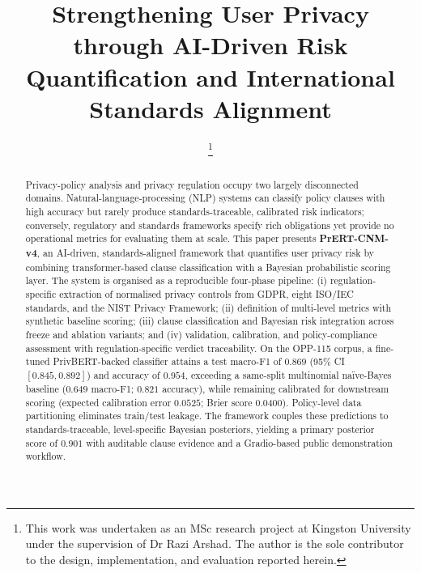 \documentclass[conference]{IEEEtran}
\begin{document}
\title{Strengthening User Privacy through AI-Driven Risk Quantification and International Standards Alignment}

\author{%
%
\thanks{This work was undertaken as an MSc research project at Kingston University under the supervision of Dr Razi Arshad. The author is the sole contributor to the design, implementation, and evaluation reported herein.}%
}

\maketitle

\begin{abstract}
Privacy-policy analysis and privacy regulation occupy two largely
disconnected domains. Natural-language-processing (NLP) systems can
classify policy clauses with high accuracy but rarely produce
standards-traceable, calibrated risk indicators; conversely, regulatory
and standards frameworks specify rich obligations yet provide no
operational metrics for evaluating them at scale. This paper presents
\textbf{PrERT-CNM-v4}, an AI-driven, standards-aligned framework that
quantifies user privacy risk by combining transformer-based clause
classification with a Bayesian probabilistic scoring layer. The system
is organised as a reproducible four-phase pipeline: (i) regulation-specific
extraction of normalised privacy controls from GDPR, eight ISO/IEC
standards, and the NIST Privacy Framework; (ii) definition of multi-level
metrics with synthetic baseline scoring; (iii) clause classification and
Bayesian risk integration across freeze and ablation variants; and (iv)
validation, calibration, and policy-compliance assessment with
regulation-specific verdict traceability. On the OPP-115 corpus, a fine-tuned
PrivBERT-backed classifier attains a test macro-F1 of $0.869$
(95\% CI $[0.845, 0.892]$) and accuracy of $0.954$, exceeding a
same-split multinomial na\"ive-Bayes baseline ($0.649$ macro-F1;
$0.821$ accuracy), while remaining calibrated for downstream scoring
(expected calibration error $0.0525$; Brier score $0.0400$). Policy-level
data partitioning eliminates train/test leakage. The framework couples
these predictions to standards-traceable, level-specific Bayesian
posteriors, yielding a primary posterior score of $0.901$ with auditable
clause evidence and a Gradio-based public demonstration workflow.
\end{abstract}
\end{document}
